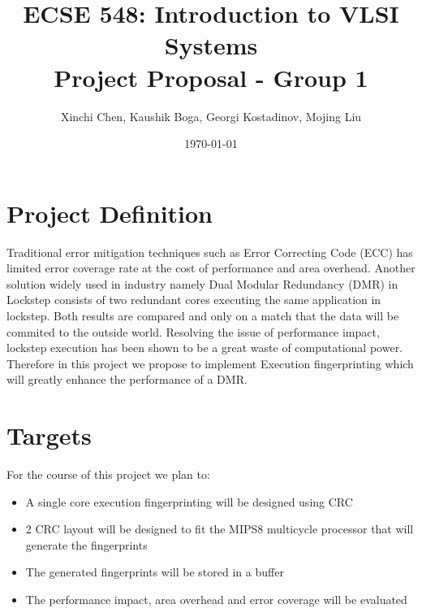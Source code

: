 \documentclass[dvips,12pt]{article}
\begin{document}
\title{ECSE 548: Introduction to VLSI Systems\protect\\Project Proposal - Group 1}

\author{Xinchi Chen, Kaushik Boga, Georgi Kostadinov, Mojing Liu}
\date{\today}



\maketitle


\section{Project Definition}


Traditional error mitigation techniques such as Error Correcting Code (ECC)
has limited error coverage rate at the cost of performance and area overhead. Another solution widely used in
industry namely Dual Modular Redundancy (DMR) in Lockstep consists of two redundant cores executing the same application
in lockstep. Both results are compared and only on a match that the data will be commited to the outside world. 
Resolving the issue of performance impact, lockstep execution has been shown to be a great waste of computational
power. Therefore in this project we propose to implement Execution fingerprinting which will greatly enhance the performance
of a DMR.


\section{Targets}

For the course of this project we plan to:
\begin{itemize}
\item A single core execution fingerprinting will be designed using CRC
\item 2 CRC layout will be designed to fit the MIPS8 multicycle processor that will generate the fingerprints
\item The generated fingerprints will be stored in a buffer
\item The performance impact, area overhead and error coverage will be evaluated
\end{itemize}
\end{document}
